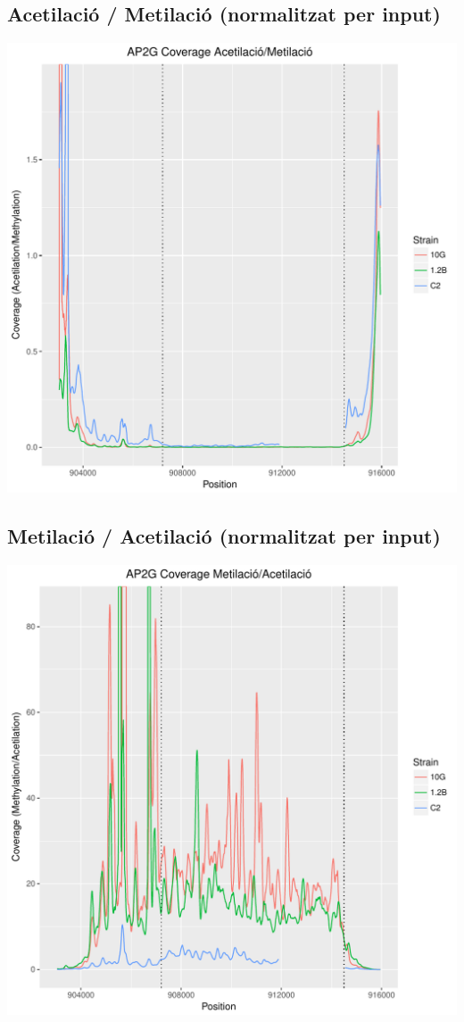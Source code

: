 \documentclass{article}\usepackage[]{graphicx}\usepackage[]{color}
\newenvironment{knitrout}{}{} %
\begin{document}
\subsection{Acetilació / Metilació (normalitzat per input)}
\begin{knitrout}
\color{fgcolor}
\includegraphics[width=1\linewidth]{figure/Ac_Met-1} 

\end{knitrout}
\clearpage
\subsection{Metilació / Acetilació (normalitzat per input)}
\begin{knitrout}
\color{fgcolor}
\includegraphics[width=1\linewidth]{figure/Met_Ac-1} 

\end{knitrout}
\end{document}
